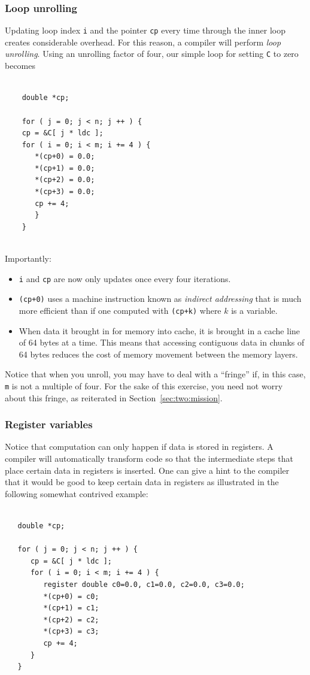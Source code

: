 \subsubsection{Loop unrolling}

Updating loop index {\tt i} and the pointer {\tt cp} every time through the inner loop creates considerable overhead.  For this reason, a compiler will perform {\em loop unrolling}.  Using an unrolling factor of four, our simple loop for setting {\tt C} to zero becomes
 \begin{verbatim}
 
    double *cp;
 
    for ( j = 0; j < n; j ++ ) {
    cp = &C[ j * ldc ];           
    for ( i = 0; i < m; i += 4 ) {                
       *(cp+0) = 0.0; 
       *(cp+1) = 0.0; 
       *(cp+2) = 0.0; 
       *(cp+3) = 0.0;
       cp += 4;                
       }                                           
    }  
              
 \end{verbatim}
Importantly:
\begin{itemize}
	\item {\tt i} and {\tt cp} are now only updates once every four iterations.
	\item {\tt *(cp+0)} uses a machine instruction known as {\em indirect addressing} that is much more efficient than if one computed with {\tt *(cp+k)} where $ k $ is a variable.  
	\item
	When data it brought in for memory into cache, it is brought in a cache line of 64 bytes at a time.  This means that accessing contiguous data in chunks of 64 bytes reduces the cost of memory movement between the memory layers.
\end{itemize}
Notice that when you unroll, you may have to deal with a ``fringe'' if, in this case, {\tt m} is not a multiple of four.    For the sake of this exercise, you need not worry about this fringe, as reiterated in Section~\ref{sec:two:mission}.

\subsubsection{Register variables}

Notice that computation can only happen if data is stored in registers.  A compiler will automatically transform code so that the intermediate steps that place certain data in registers is inserted.  One can give a hint to the compiler that it would be good to keep certain data in registers as illustrated in the following somewhat contrived example:
\begin{verbatim}

   double *cp;

   for ( j = 0; j < n; j ++ ) {
      cp = &C[ j * ldc ];           
      for ( i = 0; i < m; i += 4 ) {
         register double c0=0.0, c1=0.0, c2=0.0, c3=0.0;                
         *(cp+0) = c0; 
         *(cp+1) = c1; 
         *(cp+2) = c2; 
         *(cp+3) = c3;
         cp += 4;                
      }                                           
   }       
\end{verbatim}

